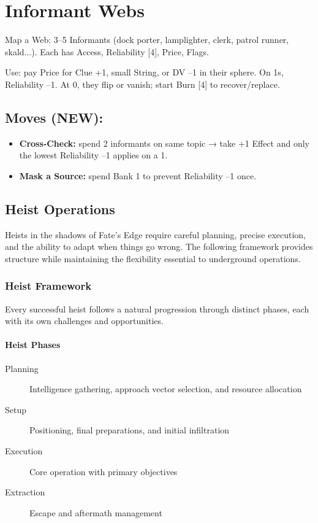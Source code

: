 \documentclass[11pt]{article}
\begin{document}
\section{Informant Webs}
Map a Web: 3--5 Informants (dock porter, lamplighter, clerk, patrol runner, skald...). Each has Access, Reliability [4], Price, Flags.

Use: pay Price for Clue +1, small String, or DV --1 in their sphere. On 1s, Reliability --1. At 0, they flip or vanish; start Burn [4] to recover/replace.

\subsection*{Moves (NEW):}
\begin{itemize}
\item \textbf{Cross‑Check:} spend 2 informants on same topic → take +1 Effect and only the lowest Reliability --1 applies on a 1.
\item \textbf{Mask a Source:} spend Bank 1 to prevent Reliability --1 once.
\end{itemize}

\subsection{Heist Operations}

Heists in the shadows of Fate's Edge require careful planning, precise execution, and the ability to adapt when things go wrong. The following framework provides structure while maintaining the flexibility essential to underground operations.

\subsubsection{Heist Framework}

Every successful heist follows a natural progression through distinct phases, each with its own challenges and opportunities.

\paragraph{Heist Phases}

\begin{description}
    \item[Planning] Intelligence gathering, approach vector selection, and resource allocation
    \item[Setup] Positioning, final preparations, and initial infiltration  
    \item[Execution] Core operation with primary objectives
    \item[Extraction] Escape and aftermath management
\end{description}
\end{document}
